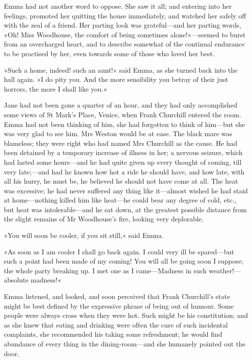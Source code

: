 Emma had not another word to oppose. She saw it all; and entering into her feelings, promoted her quitting the house immediately, and watched her safely off with the zeal of a friend. Her parting look was grateful—and her parting words, »Oh! Miss Woodhouse, the comfort of being sometimes alone!«—seemed to burst from an overcharged heart, and to describe somewhat of the continual endurance to be practised by her, even towards some of those who loved her best.

»Such a home, indeed! such an aunt!« said Emma, as she turned back into the hall again. »I do pity you. And the more sensibility you betray of their just horrors, the more I shall like you.«

Jane had not been gone a quarter of an hour, and they had only accomplished some views of St Mark's Place, Venice, when Frank Churchill entered the room. Emma had not been thinking of him, she had forgotten to think of him—but she was very glad to see him. Mrs Weston would be at ease. The black mare was blameless; they were right who had named Mrs Churchill as the cause. He had been detained by a temporary increase of illness in her; a nervous seizure, which had lasted some hours—and he had quite given up every thought of coming, till very late;—and had he known how hot a ride he should have, and how late, with all his hurry, he must be, he believed he should not have come at all. The heat was excessive; he had never suffered any thing like it—almost wished he had staid at home—nothing killed him like heat—he could bear any degree of cold, etc., but heat was intolerable—and he sat down, at the greatest possible distance from the slight remains of Mr Woodhouse's fire, looking very deplorable.

»You will soon be cooler, if you sit still,« said Emma.

»As soon as I am cooler I shall go back again. I could very ill be spared—but such a point had been made of my coming! You will all be going soon I suppose; the whole party breaking up. I met one as I came—Madness in such weather!—absolute madness!«

Emma listened, and looked, and soon perceived that Frank Churchill's state might be best defined by the expressive phrase of being out of humour. Some people were always cross when they were hot. Such might be his constitution; and as she knew that eating and drinking were often the cure of such incidental complaints, she recommended his taking some refreshment; he would find abundance of every thing in the dining-room—and she humanely pointed out the door.

